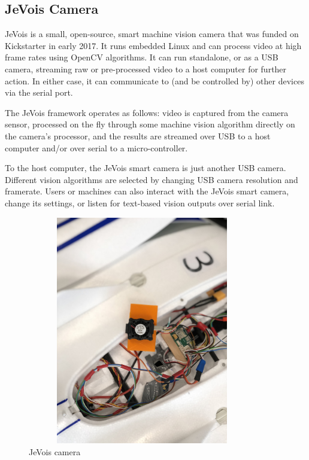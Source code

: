 \subsection{JeVois Camera}
JeVois is a small, open-source, smart machine vision camera that was funded on Kickstarter in early 2017. It runs embedded Linux and can process video at high frame rates using OpenCV algorithms. It can run standalone, or as a USB camera, streaming raw or pre-processed video to a host computer for further action. In either case, it can communicate to (and be controlled by) other devices via the serial port.

The JeVois framework operates as follows: video is captured from the camera sensor, processed on the fly through some machine vision algorithm directly on the camera's processor, and the results are streamed over USB to a host computer and/or over serial to a micro-controller.

To the host computer, the JeVois smart camera is just another USB camera. Different vision algorithms are selected by changing USB camera resolution and framerate. Users or machines can also interact with the JeVois smart camera, change its settings, or listen for text-based vision outputs over serial link.\cite{JeVois}
\begin{figure}[H]
\centering
\includegraphics[width=10cm,height=10cm,keepaspectratio]{imagenes/jevois.jpg}
\caption{JeVois camera}
\label{fig:jevois}
\end{figure}

